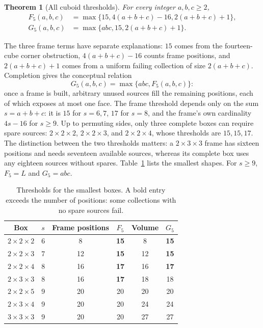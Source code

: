\documentclass[11pt]{article}
\newtheorem{theorem}{Theorem}
\theoremstyle{remark}
\begin{document}
\begin{theorem}[All cuboid thresholds]\label{thm:all-boxes}
For every integer $a,b,c\ge2$,
\[
 \begin{aligned}
 F_5(a,b,c)&=\max\{15,4(a+b+c)-16,2(a+b+c)+1\},\\
 G_5(a,b,c)&=\max\{abc,15,2(a+b+c)+1\}.
 \end{aligned}
\]
\end{theorem}
The three frame terms have separate explanations: $15$ comes from the
fourteen-cube corner obstruction, $4(a+b+c)-16$ counts frame positions,
and $2(a+b+c)+1$ comes from a uniform failing collection of size $2(a+b+c)$.
Completion gives the conceptual relation
\[
 G_5(a,b,c)=\max\{abc,F_5(a,b,c)\}:
\]
once a frame is built, arbitrary unused sources fill the remaining positions,
each of which exposes at most one face.
The frame threshold depends only on the sum $s=a+b+c$: it is $15$ for
$s=6,7$, $17$ for $s=8$, and the frame's own cardinality $4s-16$ for
$s\ge9$. Up to permuting sides, only three complete boxes can require
spare sources: $2\times2\times2$, $2\times2\times3$, and
$2\times2\times4$, whose thresholds are $15,15,17$.
The distinction between the two thresholds matters: a $2\times3\times3$
frame has sixteen positions and needs seventeen available sources,
whereas its complete box uses any eighteen sources without spares.
Table~\ref{tab:small-boxes} lists the smallest shapes. For $s\ge9$,
$F_5=L$ and $G_5=abc$.
\begin{table}[ht]
\centering
\small
\begin{tabular}{c c c c c c}
\toprule
Box & $s$ & Frame positions & $F_5$ & Volume & $G_5$\\
\midrule
$2\times2\times2$ & 6 & 8 & \textbf{15} & 8 & \textbf{15}\\
$2\times2\times3$ & 7 & 12 & \textbf{15} & 12 & \textbf{15}\\
$2\times2\times4$ & 8 & 16 & \textbf{17} & 16 & \textbf{17}\\
$2\times3\times3$ & 8 & 16 & \textbf{17} & 18 & 18\\
$2\times2\times5$ & 9 & 20 & 20 & 20 & 20\\
$2\times3\times4$ & 9 & 20 & 20 & 24 & 24\\
$3\times3\times3$ & 9 & 20 & 20 & 27 & 27\\
\bottomrule
\end{tabular}
\caption{Thresholds for the smallest boxes. A bold entry exceeds the number
of positions: some collections with no spare sources fail.}
\label{tab:small-boxes}
\end{table}
\end{document}
